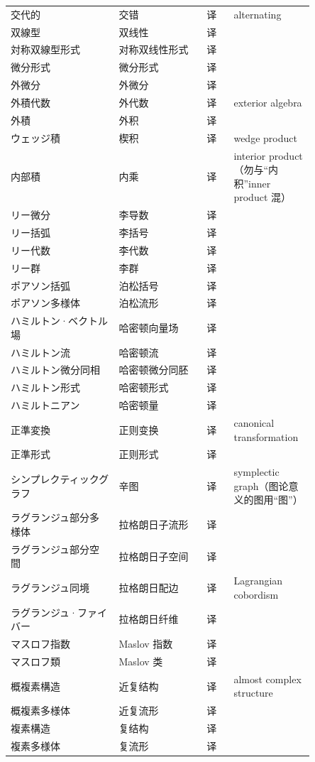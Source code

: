 {\begin{longtable}{p{0.32\linewidth} p{0.26\linewidth} p{0.08\linewidth} p{0.19\linewidth}}
交代的 & 交错 & 译 & alternating \\
双線型 & 双线性 & 译 &  \\
対称双線型形式 & 对称双线性形式 & 译 &  \\
微分形式 & 微分形式 & 译 &  \\
外微分 & 外微分 & 译 &  \\
外積代数 & 外代数 & 译 & exterior algebra \\
外積 & 外积 & 译 &  \\
ウェッジ積 & 楔积 & 译 & wedge product \\
内部積 & 内乘 & 译 & interior product（勿与“内积”inner product 混） \\
リー微分 & 李导数 & 译 &  \\
リー括弧 & 李括号 & 译 &  \\
リー代数 & 李代数 & 译 &  \\
リー群 & 李群 & 译 &  \\
ポアソン括弧 & 泊松括号 & 译 &  \\
ポアソン多様体 & 泊松流形 & 译 &  \\
ハミルトン·ベクトル場 & 哈密顿向量场 & 译 &  \\
ハミルトン流 & 哈密顿流 & 译 &  \\
ハミルトン微分同相 & 哈密顿微分同胚 & 译 &  \\
ハミルトン形式 & 哈密顿形式 & 译 &  \\
ハミルトニアン & 哈密顿量 & 译 &  \\
正準変換 & 正则变换 & 译 & canonical transformation \\
正準形式 & 正则形式 & 译 &  \\
シンプレクティックグラフ & 辛图 & 译 & symplectic graph（图论意义的图用“图”） \\
ラグランジュ部分多様体 & 拉格朗日子流形 & 译 &  \\
ラグランジュ部分空間 & 拉格朗日子空间 & 译 &  \\
ラグランジュ同境 & 拉格朗日配边 & 译 & Lagrangian cobordism \\
ラグランジュ·ファイバー & 拉格朗日纤维 & 译 &  \\
マスロフ指数 & Maslov 指数 & 译 &  \\
マスロフ類 & Maslov 类 & 译 &  \\
概複素構造 & 近复结构 & 译 & almost complex structure \\
概複素多様体 & 近复流形 & 译 &  \\
複素構造 & 复结构 & 译 &  \\
複素多様体 & 复流形 & 译 &  \\

\end{longtable}}

